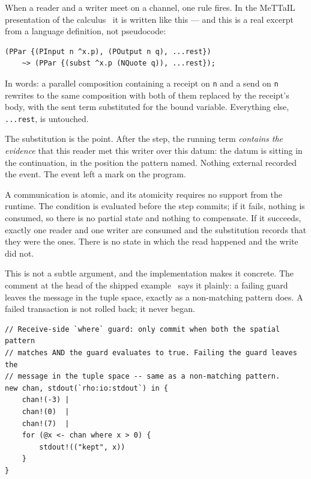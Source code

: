 When a reader and a writer meet on a channel, one rule fires. In the MeTTaIL
presentation of the calculus~\cite{mettailrust} it is written like this --- and this is a real
excerpt from a language definition, not pseudocode:

\begin{lstlisting}[language=mettail]
(PPar {(PInput n ^x.p), (POutput n q), ...rest})
    ~> (PPar {(subst ^x.p (NQuote q)), ...rest});
\end{lstlisting}

In words: a parallel composition containing a receipt on \texttt{n} and a send
on \texttt{n} rewrites to the same composition with both of them replaced by the
receipt's body, with the sent term substituted for the bound variable. Everything
else, \texttt{...rest}, is untouched.

The substitution is the point. After the step, the running term \emph{contains
the evidence} that this reader met this writer over this datum: the datum is
sitting in the continuation, in the position the pattern named. Nothing external
recorded the event. The event left a mark on the program.

\begin{claim}
\label{claim:witness}
A communication is atomic, and its atomicity requires no support from the
runtime. The condition is evaluated before the step commits; if it fails,
nothing is consumed, so there is no partial state and nothing to compensate. If
it succeeds, exactly one reader and one writer are consumed and the substitution
records that they were the ones. There is no state in which the read happened
and the write did not.
\end{claim}

This is not a subtle argument, and the implementation makes it concrete. The
comment at the head of the shipped example~\cite{f1r3node} says it plainly: a
failing guard
leaves the message in the tuple space, exactly as a non-matching pattern does. A
failed transaction is not rolled back; it never began.

\begin{lstlisting}
// Receive-side `where` guard: only commit when both the spatial pattern
// matches AND the guard evaluates to true. Failing the guard leaves the
// message in the tuple space -- same as a non-matching pattern.
new chan, stdout(`rho:io:stdout`) in {
    chan!(-3) |
    chan!(0)  |
    chan!(7)  |
    for (@x <- chan where x > 0) {
        stdout!(("kept", x))
    }
}
\end{lstlisting}

